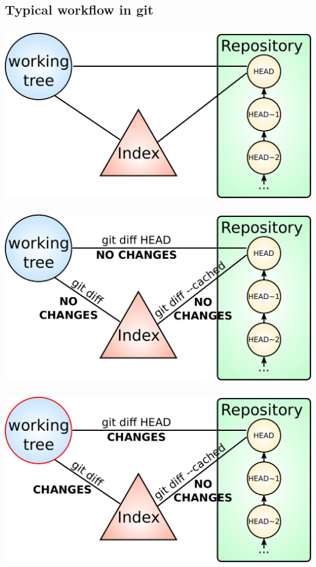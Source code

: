 \subsection{Typical workflow in git}
\begin{frame}
  \frametitle{\insertsubsection}
  \begin{center}
    \includegraphics[width=1.0\textwidth]{images/pdf/git-detailed-1.pdf}
  \end{center}
\end{frame}
\begin{frame}
  \frametitle{\insertsubsection}
  \begin{center}
    \includegraphics[width=1.0\textwidth]{images/pdf/git-detailed-2.pdf}
  \end{center}
\end{frame}
\begin{frame}
  \frametitle{\insertsubsection}
  \begin{center}
    \includegraphics[width=1.0\textwidth]{images/pdf/git-detailed-3.pdf}
  \end{center}
\end{frame}
